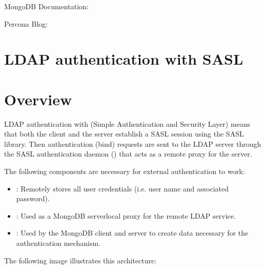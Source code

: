 \documentclass[letterpaper,10pt,english]{sphinxmanual}
\begin{document}
\sphinxAtStartPar
MongoDB Documentation: 

\sphinxAtStartPar
Percona Blog: 




\section{LDAP authentication with SASL}
\label{\detokenize{authentication:ldap-authentication-with-sasl}}\label{\detokenize{authentication:ldap-authentication-sasl}}

\section{Overview}
\label{\detokenize{authentication:overview}}
\sphinxAtStartPar
LDAP authentication with  (Simple Authentication and Security Layer) means that both the client and the server establish a SASL session using the SASL library. Then authentication (bind) requests are sent to the LDAP server through the SASL authentication daemon () that acts as a remote proxy for the  server.

\sphinxAtStartPar
The following components are necessary for external authentication to work:
\begin{itemize}
\item {} 
\sphinxAtStartPar
{}: Remotely stores all user credentials
(i.e. user name and associated password).

\item {} 
\sphinxAtStartPar
{}: Used as a MongoDB server\sphinxhyphen{}local proxy
for the remote LDAP service.

\item {} 
\sphinxAtStartPar
{}: Used by the MongoDB client and server
to create data necessary for the authentication mechanism.

\end{itemize}

\sphinxAtStartPar
The following image illustrates this architecture:

\end{document}
